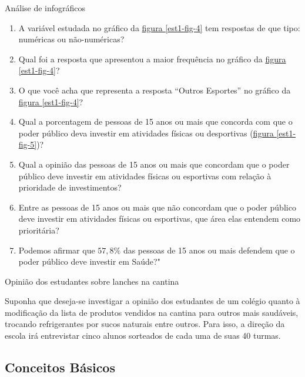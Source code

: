 \begin{task}{ Análise de infográficos}
\begin{enumerate}
\item {} 
A variável estudada no gráfico da \hyperref[est1-fig-4]{figura \ref{est1-fig-4}} tem respostas de que tipo: numéricas ou não-numéricas?

\item {} 
Qual foi a resposta que apresentou a maior frequência no gráfico da \hyperref[est1-fig-4]{figura \ref{est1-fig-4}}?

\item {} 
O que você acha que representa a resposta “Outros Esportes” no gráfico da \hyperref[est1-fig-4]{figura \ref{est1-fig-4}}?

\item {} 
Qual a porcentagem de pessoas de 15 anos ou mais que concorda com que o poder público deva investir em atividades físicas ou desportivas (\hyperref[est1-fig-5]{figura \ref{est1-fig-5}})?

\item {} 
Qual a opinião das pessoas de 15 anos ou mais que concordam que o poder público deve investir em atividades físicas ou esportivas com relação à prioridade de investimentos?

\item {} 
Entre as pessoas de 15 anos ou mais que não concordam que o poder público deve investir em atividades físicas ou esportivas, que área elas entendem como prioritária?

\item {} 
Podemos afirmar que $57{,}8\%$ das pessoas de 15 anos ou mais defendem que o poder público deve investir em Saúde?"

\end{enumerate}
\end{task}



\label{est1-org-1}

\begin{example}{Opinião dos estudantes sobre lanches na cantina}

Suponha que deseja-se investigar a opinião dos estudantes de um colégio quanto à modificação da lista de produtos vendidos na cantina para outros mais saudáveis, trocando refrigerantes por sucos naturais entre outros. Para isso, a direção da escola irá entrevistar cinco alunos sorteados de cada uma de suas 40 turmas.

\end{example}

\subsection{Conceitos Básicos}
\label{est1-conceitos-1}



